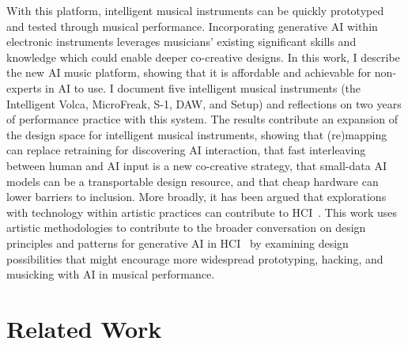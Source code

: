 \documentclass[sigconf]{nimeart}
\begin{document}
With this platform, intelligent musical instruments can be quickly prototyped and tested through musical performance.
Incorporating generative AI within electronic instruments leverages musicians' existing significant skills and knowledge which could enable deeper co-creative designs.
In this work, I describe the new AI music platform, showing that it is affordable and achievable for non-experts in AI to use.
I document five intelligent musical instruments (the Intelligent Volca, MicroFreak, S-1, DAW, and Setup) and reflections on two years of performance practice with this system.
The results contribute an expansion of the design space for intelligent musical instruments, showing that (re)mapping can replace retraining for discovering AI interaction, that fast interleaving between human and AI input is a new co-creative strategy, that small-data AI models can be a transportable design resource, and that cheap hardware can lower barriers to inclusion.
More broadly, it has been argued that explorations with technology within artistic practices can contribute to HCI~\cite{improvisation-arts-hci-2018, artistic-narratives-hci, state-of-arts-inchi-2022, interactive-art-hci-2019}.
This work uses artistic methodologies to contribute to the broader conversation on design principles and patterns for generative AI in HCI~\cite{design-principles-genai-2024} by examining design possibilities that might encourage more widespread prototyping, hacking, and musicking with AI in musical performance.

\section{Related Work}\label{related-work}

\end{document}
